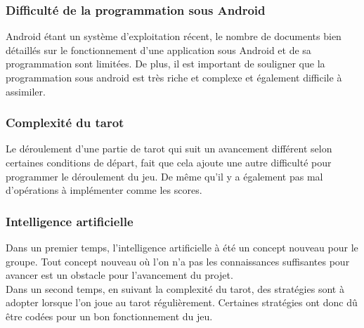 \documentclass[a4paper]{report}
\begin{document}
			\subsubsection{Difficulté de la programmation sous Android}
Android étant un système d’exploitation récent, le nombre de documents bien détaillés sur le fonctionnement d’une application sous Android et de sa programmation sont limitées. De plus, il est important de souligner que la programmation sous android est très riche et complexe et également difficile à assimiler.\\

			\subsubsection{Complexité du tarot}
Le déroulement d’une partie de tarot qui suit un avancement différent selon certaines conditions de départ, fait que cela ajoute une autre difficulté pour programmer le déroulement du jeu. De même qu’il y a également pas mal d’opérations à implémenter comme les scores.\\

			\subsubsection{Intelligence artificielle}
Dans un premier temps, l’intelligence artificielle à été un concept nouveau pour le groupe. Tout concept nouveau où l’on n’a pas les connaissances suffisantes pour avancer est un obstacle pour l’avancement du projet.\\
Dans un second temps, en suivant la complexité du tarot, des stratégies sont à adopter lorsque l’on joue au tarot régulièrement. Certaines stratégies ont donc dû être codées pour un bon fonctionnement du jeu.\\
\end{document}
